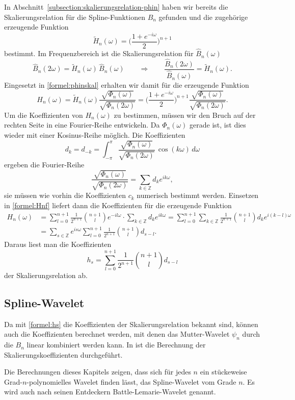 In Abschnitt~\ref{subsection:skalierungsrelation-phin} haben wir bereits
die Skalierungsrelation für die Spline-Funktionen $B_n$ gefunden und die
zugehörige erzeugende Funktion
\[
\tilde{H}_n(\omega) = \biggl(\frac{1+e^{-i\omega}}{2}\biggr)^{n+1}
\]
bestimmt.
Im Frequenzbereich ist die Skalierungsrelation für $\hat{B}_n(\omega)$
\[
\hat{B}_n(2\omega)=\tilde{H}_n(\omega) \, \hat{B}_n(\omega)
\qquad\Rightarrow\qquad
\frac{\hat{B}_n(2\omega)}{\hat{B}_n(\omega)}
=
\tilde{H}_n(\omega).
\]
Eingesetzt in \eqref{formel:phinskal} erhalten wir damit für die 
erzeugende Funktion 
\begin{equation}
H_n(\omega)
=
\tilde{H}_n(\omega)
\frac{\sqrt{\Phi_n(\omega)}}{\sqrt{\Phi_n(2\omega)}}
=
\biggl(
\frac{1+e^{-i\omega}}{2}
\biggr)^{n+1}
\frac{\sqrt{\Phi_n(\omega)}}{\sqrt{\Phi_n(2\omega)}}.
\label{formel:Hnf}
\end{equation}
Um die Koeffizienten von $H_n(\omega)$ zu bestimmen, müssen wir den
Bruch auf der rechten Seite in eine Fourier-Reihe entwickeln.
Da $\Phi_n(\omega)$ gerade ist, ist dies wieder mit einer Kosinus-Reihe
möglich.
Die Koeffizienten
\[
d_k
=
d_{-k}
=
\int_{-\pi}^\pi
\frac{\sqrt{\Phi_n(\omega)}}{\sqrt{\Phi_n(2\omega)}}
\,\cos(k\omega)
\,d\omega
\]
ergeben die Fourier-Reihe
\[
\frac{\sqrt{\Phi_n(\omega)}}{\sqrt{\Phi_n(2\omega)}}
=
\sum_{k\in\mathbb Z} d_k e^{ik\omega},
\]
sie müssen wie vorhin die Koeffizienten $c_k$ numerisch bestimmt werden.
Einsetzen in \eqref{formel:Hnf} liefert dann die Koeffizienten für die
erzeugende Funktion
\begin{align*}
H_n(\omega)
&=
\sum_{l=0}^{n+1} \frac1{2^{n+1}} \binom{n+1}{l} e^{-il\omega}
\cdot
\sum_{k\in\mathbb Z} d_ke^{ik\omega}
=
\sum_{l=0}^{n+1}
\sum_{k\in\mathbb Z}
\frac{1}{2^{n+1}}
\binom{n+1}{l}d_k
e^{i(k-l)\omega}
\\
&=
\sum_{s\in\mathbb Z}
e^{is\omega}
\sum_{l=0}^{n+1}
\frac{1}{2^{n+1}}
\binom{n+1}{l}d_{s-l}.
\end{align*}
Daraus liest man die Koeffizienten
\begin{equation}
h_s
= 
\sum_{l=0}^{n+1}
\frac{1}{2^{n+1}}
\binom{n+1}{l}d_{s-l}
\label{formel:hs}
\end{equation}
der Skalierungsrelation ab.

\subsection{Spline-Wavelet
\label{subsection:spline-wavelet}}
Da mit \eqref{formel:hs} die Koeffizienten der Skalierungsrelation bekannt
sind, können auch die Koeffizienten berechnet werden, mit denen das
Mutter-Wavelet $\psi_n$ durch die $B_n$ linear kombiniert werden kann.
In \cite{buch:blatter} ist die Berechnung der Skalierungskoeffizienten 
durchgeführt.

Die Berechnungen dieses Kapitels zeigen, dass sich für jedes $n$ ein 
stückeweise Grad-$n$-po\-ly\-no\-mi\-elles Wavelet finden lässt,
das Spline-Wavelet vom Grade $n$.
Es wird auch nach seinen Entdeckern Battle-Lemarie-Wavelet genannt.





